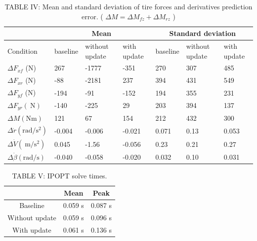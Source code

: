 \documentclass[10pt]{article}
\begin{document}
\begin{table}[h]
\begin{center}
\begin{tabular}{|l|l|l|l|l|l|l|}
\hline
 & \multicolumn{3}{|c|}{Mean} & \multicolumn{3}{|c|}{Standard deviation} \\
\hline
Condition & baseline & without update & with update & baseline & without update & with update \\
\hline
$\Delta F_{x f}$ (N) & 267 & -1777 & -351 & 270 & 307 & 485 \\
\hline
$\Delta F_{x r}$ (N) & -88 & -2181 & 237 & 394 & 431 & 549 \\
\hline
$\Delta F_{y f}$ (N) & -194 & -91 & -152 & 194 & 355 & 231 \\
\hline
$\Delta F_{y r}(\mathrm{~N})$ & -140 & -225 & 29 & 203 & 394 & 137 \\
\hline
$\Delta M(\mathrm{Nm})$ & 121 & 67 & 154 & 212 & 432 & 300 \\
\hline
$\Delta \dot{r}\left(\mathrm{rad} / \mathrm{s}^{2}\right)$ & -0.004 & -0.006 & -0.021 & 0.071 & 0.13 & 0.053 \\
\hline
$\Delta \dot{V}\left(\mathrm{~m} / \mathrm{s}^{2}\right)$ & 0.045 & -1.56 & -0.056 & 0.23 & 0.21 & 0.27 \\
\hline
$\Delta \dot{\beta}(\mathrm{rad} / \mathrm{s})$ & -0.040 & -0.058 & -0.020 & 0.032 & 0.10 & 0.031 \\
\hline
\end{tabular}
\captionsetup{labelformat=empty}
\caption{TABLE IV: Mean and standard deviation of tire forces and derivatives prediction error. ( $\Delta M=\Delta M_{f z}+\Delta M_{r z}$ )}
\end{center}
\end{table}

\begin{table}[h]
\begin{center}
\begin{tabular}{c|c|c}
\hline
 & Mean & Peak \\
\hline
Baseline & 0.059 s & 0.087 s \\
Without update & 0.059 s & 0.096 s \\
With update & 0.061 s & 0.136 s \\
\hline
\end{tabular}
\captionsetup{labelformat=empty}
\caption{TABLE V: IPOPT solve times.}
\end{center}
\end{table}
\end{document}
